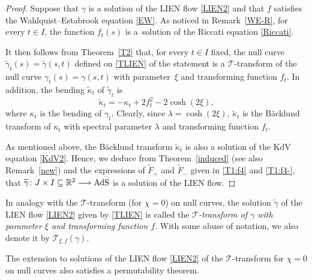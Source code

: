 \documentclass[10pt,a4paper]{amsart}
\numberwithin{equation}{section}
\def\bending{\kappa}
\def\R{\mathbb{R}}
\def\AdS{{\rm AdS}}
\begin{document}
\begin{proof} Suppose that $\gamma$ is a solution of the LIEN flow \eqref{LIEN2} and that $f$ satisfies the Wahlquist--Estabrook equation \eqref{EW}. As noticed in Remark~\ref{WE-R}, for every $t\in I$, the function $f_t(s)$ is a~solution of the Riccati equation \eqref{Riccati}.
	
	It then follows from Theorem~\ref{T2} that, for every $t\in I$ fixed, the null curve $\widetilde{\gamma}_t(s)=\widetilde{\gamma}(s,t)$ defined on \eqref{TLIEN} of the statement is a $\mathcal{T}$-transform of the null curve $\gamma_t(s)=\gamma(s,t)$ with parameter~$\xi$ and transforming function $f_t$. In addition, the bending $\widetilde{\bending}_t$ of $\widetilde{\gamma}_t$ is
	\begin{equation*}\widetilde{\bending}_t=-\bending_t+2f_t^2-2\cosh(2\xi),\end{equation*}
	where $\bending_t$ is the bending of $\gamma_t$. Clearly, since $\lambda=\cosh(2\xi)$, $\widetilde{\bending}_t$ is the B\"{a}cklund transform of $\bending_t$ with spectral parameter $\lambda$ and transforming function $f_t$.
	
	As mentioned above, the B\"{a}cklund transform $\widetilde{\bending}_t$ is also a solution of the KdV equation \eqref{KdV2}. Hence, we deduce from Theorem~\ref{induced} (see also Remark~\ref{new}) and the expressions of $\widetilde{F}_+$ and $\widetilde{F}_-$ given in \eqref{T1:f4} and \eqref{T1:f4-}, that $\widetilde{\gamma}\colon J\times I\subseteq\R^2\longrightarrow\AdS$ is a solution of the LIEN flow.
\end{proof}

\begin{Definition} In analogy with the $\mathcal{T}$-transform (for $\chi=0$) on null curves, the solution $\widetilde{\gamma}$ of the LIEN flow \eqref{LIEN2} given by \eqref{TLIEN} is called the \emph{$\mathcal{T}$-transform of $\gamma$ with parameter $\xi$ and transforming function $f$}. With some abuse of notation, we also denote it by $\mathcal{T}_{\xi,f}(\gamma)$.
\end{Definition}

The extension to solutions of the LIEN flow \eqref{LIEN2} of the $\mathcal{T}$-transform for $\chi=0$ on null curves also satisfies a permutability theorem.
\end{document}
